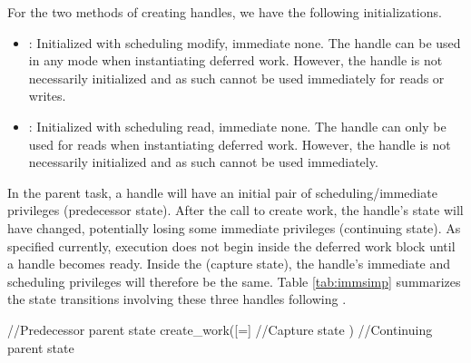 For the two methods of creating handles, we have the following initializations.
\begin{itemize}
\item {}: Initialized with scheduling modify, immediate none. 
The handle can be used in any mode when instantiating deferred work.
However, the handle is not necessarily initialized and as such cannot be used immediately for reads or writes.
%
\item {}: Initialized with scheduling read, immediate none.
The handle can only be used for reads when instantiating deferred work.
However, the handle is not necessarily initialized and as such cannot be used immediately.
\end{itemize}


In the parent task, a handle will have an initial pair of scheduling/immediate privileges (predecessor state).
After the call to create work, the handle's state will have changed, potentially losing some immediate privileges (continuing state).
As specified currently, execution does not begin inside the deferred work block until a handle becomes ready.
Inside the \cwork (capture state), the handle's immediate and scheduling privileges will therefore be the same.
Table \ref{tab:immsimp} summarizes the state transitions involving these three handles following \cwork.
\begin{CppCode}
//Predecessor parent state
create_work([=]{
  //Capture state
})
//Continuing parent state
\end{CppCode}

